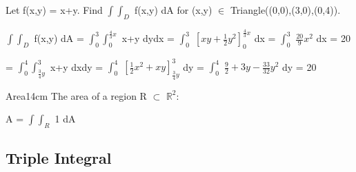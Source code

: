     \begin{example}
        Let f(x,y) = x+y.
        Find $\int \int_D$ f(x,y) dA for (x,y) $\in$ Triangle((0,0),(3,0),(0,4)).
    \end{example}

    \begin{tbox}
        $\int \int_D$ f(x,y) dA
        = $\int_0^3 \int_0^{\frac{4}{3}x}$ x+y dydx
        = $\int_0^3$ $[xy+\frac{1}{2}y^2]_0^{\frac{4}{3}x}$ dx
        = $\int_0^3$ $\frac{20}{9}x^2$ dx
        = 20

        \hspace{2.65cm}
        = $\int_0^4 \int_{\frac{3}{4}y}^3$ x+y dxdy
        = $\int_0^4$ $[\frac{1}{2}x^2+xy]_{\frac{3}{4}y}^3$ dy
        = $\int_0^4$ $\frac{9}{2} + 3y - \frac{33}{32}y^2$ dy
        = 20
    \end{tbox}

    \vspace{0.5cm}



    \begin{definition}{Area}{14cm}
        The {\color{lblue} area} of a region R $\subset$ $\mathbb{R}^2$:

        \hspace{0.5cm}
        A = $\int \int_R$ 1 dA
    \end{definition}

    \newpage





\subsection{ Triple Integral }

